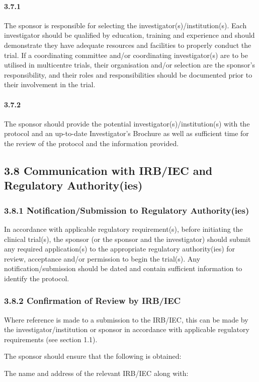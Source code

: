 \documentclass[11pt]{article}
\begin{document}
\paragraph{3.7.1} The sponsor is responsible for selecting the investigator(s)/institution(s). Each investigator should be qualified by education, training and experience and should demonstrate they have adequate resources and facilities to properly conduct the trial. If a coordinating committee and/or coordinating investigator(s) are to be utilised in multicentre trials, their organisation and/or selection are the sponsor's responsibility, and their roles and responsibilities should be documented prior to their involvement in the trial.

\paragraph{3.7.2} The sponsor should provide the potential investigator(s)/institution(s) with the protocol and an up-to-date Investigator's Brochure as well as sufficient time for the review of the protocol and the information provided.

\subsection{3.8 Communication with IRB/IEC and Regulatory Authority(ies)}

\subsubsection{3.8.1 Notification/Submission to Regulatory Authority(ies)}

In accordance with applicable regulatory requirement(s), before initiating the clinical trial(s), the sponsor (or the sponsor and the investigator) should submit any required application(s) to the appropriate regulatory authority(ies) for review, acceptance and/or permission to begin the trial(s). Any notification/submission should be dated and contain sufficient information to identify the protocol.


\subsubsection{3.8.2 Confirmation of Review by IRB/IEC}

\begin{description}[leftmargin=2.5cm,style=sameline]

\item[(a)] Where reference is made to a submission to the IRB/IEC, this can be made by the investigator/institution or sponsor in accordance with applicable regulatory requirements (see section 1.1).

\item[(b)] The sponsor should ensure that the following is obtained:

\item[(i)] The name and address of the relevant IRB/IEC along with:

\end{description}
\end{document}
